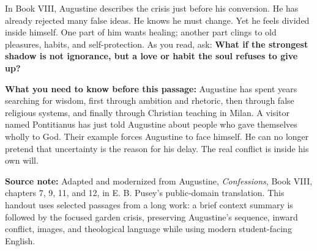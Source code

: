 \documentclass[12pt]{article}
\newcommand{\focusbox}[1]{%
\vspace{0.4em}\noindent\colorbox{gray!12}{\begin{minipage}{0.96\linewidth}#1\end{minipage}}\vspace{0.5em}}
\begin{document}
In Book VIII, Augustine describes the crisis just before his conversion. He has already rejected many false ideas. He knows he must change. Yet he feels divided inside himself. One part of him wants healing; another part clings to old pleasures, habits, and self-protection. As you read, ask: \textbf{What if the strongest shadow is not ignorance, but a love or habit the soul refuses to give up?}

\focusbox{\textbf{What you need to know before this passage:} Augustine has spent years searching for wisdom, first through ambition and rhetoric, then through false religious systems, and finally through Christian teaching in Milan. A visitor named Pontitianus has just told Augustine about people who gave themselves wholly to God. Their example forces Augustine to face himself. He can no longer pretend that uncertainty is the reason for his delay. The real conflict is inside his own will.}

\focusbox{\textbf{Source note:} Adapted and modernized from Augustine, \textit{Confessions}, Book VIII, chapters 7, 9, 11, and 12, in E. B. Pusey's public-domain translation. This handout uses selected passages from a long work: a brief context summary is followed by the focused garden crisis, preserving Augustine's sequence, inward conflict, images, and theological language while using modern student-facing English.}
\end{document}
